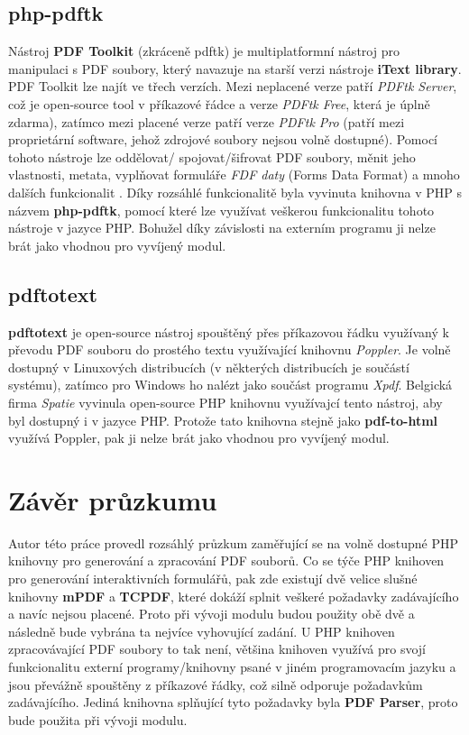 \subsection{php-pdftk}
Nástroj \textbf{PDF Toolkit} (zkráceně pdftk) je multiplatformní nástroj pro manipulaci s PDF soubory, který navazuje na starší verzi nástroje \textbf{iText library}. PDF Toolkit lze najít ve třech verzích. Mezi neplacené verze patří \textit{PDFtk Server}, což je open-source tool v příkazové řádce a verze \textit{PDFtk Free}, která je úplně zdarma), zatímco mezi placené verze patří verze \textit{PDFtk Pro} (patří mezi proprietární software, jehož zdrojové soubory nejsou volně dostupné). Pomocí tohoto nástroje lze oddělovat/ spojovat/šifrovat PDF soubory, měnit jeho vlastnosti, metata, vyplňovat formuláře \textit{FDF daty} (Forms Data Format) a mnoho dalších funkcionalit \cite{phppdftk}. Díky rozsáhlé funkcionalitě byla vyvinuta knihovna v PHP s názvem \textbf{php-pdftk}, pomocí které lze využívat veškerou funkcionalitu tohoto nástroje v jazyce PHP. Bohužel díky závislosti na externím programu ji nelze brát jako vhodnou pro vyvíjený modul.
\subsection{pdftotext}
\textbf{pdftotext} je open-source nástroj spouštěný přes příkazovou řádku využívaný k převodu PDF souboru do prostého textu využívající knihovnu \textit{Poppler}. Je volně dostupný v Linuxových distribucích (v některých distribucích je součástí systému), zatímco pro Windows ho nalézt jako součást programu \textit{Xpdf}. Belgická firma \textit{Spatie} vyvinula open-source PHP knihovnu využívajcí tento nástroj, aby byl dostupný i v jazyce PHP. Protože tato knihovna stejně jako \textbf{pdf-to-html} využívá Poppler, pak ji nelze brát jako vhodnou pro vyvíjený modul.
\section{Závěr průzkumu}
Autor této práce provedl rozsáhlý průzkum zaměřující se na volně dostupné PHP knihovny pro generování a zpracování PDF souborů. Co se týče PHP knihoven pro generování interaktivních formulářů, pak zde existují  dvě velice slušné knihovny \textbf{mPDF} a \textbf{TCPDF}, které dokáží  splnit veškeré požadavky zadávajícího a navíc nejsou placené. Proto při vývoji modulu budou použity obě dvě a následně bude vybrána ta nejvíce vyhovující zadání. U PHP knihoven zpracovávající PDF soubory to tak není, většina knihoven využívá pro svojí funkcionalitu externí programy/knihovny psané v jiném programovacím jazyku a jsou převážně spouštěny z příkazové řádky, což silně odporuje požadavkům zadávajícího. Jediná knihovna splňující tyto požadavky byla \textbf{PDF Parser}, proto bude použita při vývoji modulu. 